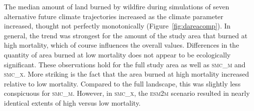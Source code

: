 \documentclass[12pt]{article}
\begin{document}
\begin{spacing}{1}
The median amount of land burned by wildfire during simulations of seven alternative future climate trajectories increased as the climate parameter increased, thought not perfectly monotonically (Figure~\ref{fig:dareacomp}). In general, the trend was strongest for the amount of the study area that burned at high mortality, which of course influences the overall values. Differences in the quantity of area burned at low mortality does not appear to be ecologically significant. These observations hold for the full study area as well as \textsc{smc\_m} and \textsc{smc\_x}. More striking is the fact that the area burned at high mortality increased relative to low mortality. Compared to the full landscape, this was slightly less conspicuous for \textsc{smc\_m}. However, in \textsc{smc\_x}, the \textsc{esm2m} scenario resulted in nearly identical extents of high versus low mortality. 






\end{spacing}
\end{document}
